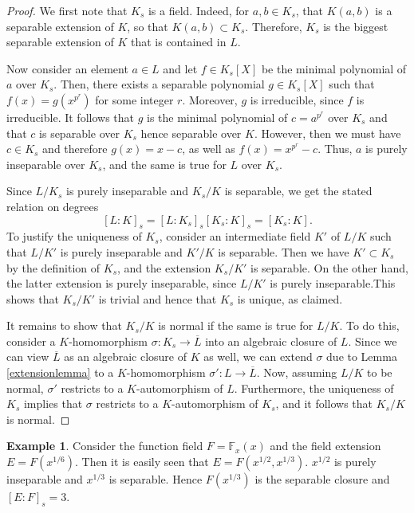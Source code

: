 \documentclass[12pt]{report}
\theoremstyle{definition}
\newtheorem{example}[thm]{Example}
\def\FF{\mathbb{F}}
\begin{document}
\begin{proof}
    We first note that $K_s$ is a field. Indeed, for $a, b\in K_s$, that $K(a, b)$ is a separable extension of $K$, so that $K(a, b) \subset K_s$. Therefore, $K_s$ is the biggest separable extension of $K$ that is contained in $L$.
    
    Now consider an element $a\in L$ and let $f\in K_s[X]$ be the minimal polynomial of $a$ over $K_s$. Then, there exists a separable polynomial $g\in K_s[X]$ such that $f(x) = g(x^{p^r})$ for some integer $r$. Moreover, $g$ is irreducible, since $f$ is irreducible. It follows that $g$ is the minimal polynomial of $c = a^{p^r}$ over $K_s$ and that $c$ is separable over $K_s$ hence separable over $K$. However, then we must have $c\in K_s$ and therefore $g(x) = x - c$, as well as $f(x) = x^{p^r} - c$. Thus, $a$ is purely inseparable over $K_s$, and the same is true for $L$ over $K_s$.


    Since $L/K_s$ is purely inseparable and $K_s/K$ is separable, we get the stated relation on degrees $$[L:K]_s=[L:K_s]_s[K_s:K]_s=[K_s:K].$$
    To justify the uniqueness of $K_s$, consider an intermediate field $K'$ of $L/K$ such that $L/K'$ is purely inseparable and $K'/K$ is separable. Then we have $K' \subset K_s$ by the definition of $K_s$, and the extension $K_s/K'$ is separable. On the other hand, the latter extension is purely inseparable, since $L/K'$ is purely inseparable.This shows that $K_s/K'$ is trivial and hence that $K_s$ is unique, as claimed.


    It remains to show that $K_s/K$ is normal if the same is true for $L/K$. To do this, consider a $K$-homomorphism $\sigma : K_s\to \overline{L}$ into an algebraic closure of $L$. Since we can view $\overline{L}$ as an algebraic closure of $K$ as well, we can extend $\sigma$ due to Lemma \ref{extensionlemma} to a $K$-homomorphism $\sigma' : L\to \overline{L}$. Now, assuming $L/K$ to be normal, $\sigma'$ restricts to a $K$-automorphism of $L$. Furthermore, the uniqueness of $K_s$ implies that $\sigma$ restricts to a $K$-automorphism of $K_s$, and it follows that $K_s/K$ is normal.
\end{proof}

\begin{example}
    Consider the function field $F=\FF_x(x)$ and the field extension $E=F(x^{1/6})$. Then it is easily seen that $E=F(x^{1/2},x^{1/3})$. $x^{1/2}$ is purely inseparable and $x^{1/3}$ is separable. Hence $F(x^{1/3})$ is the separable closure and $[E:F]_s=3$.
\end{example}
\end{document}

